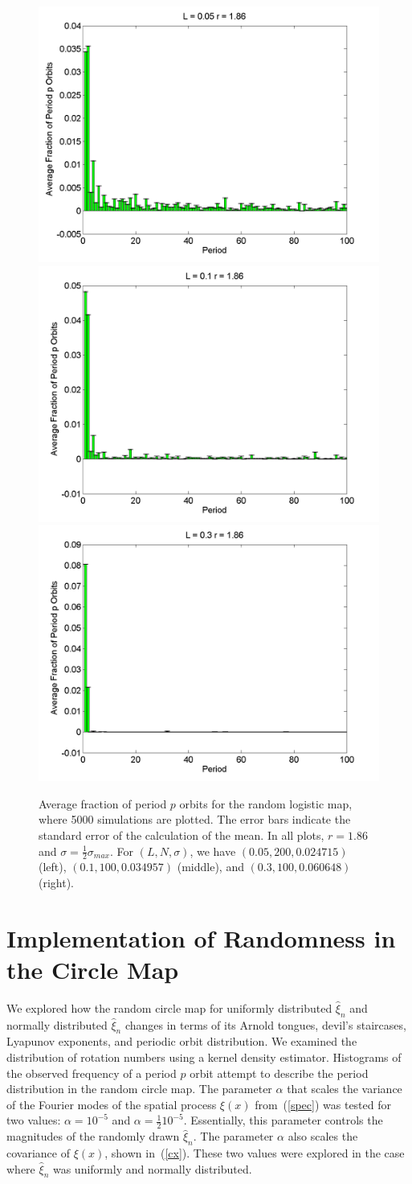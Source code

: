 \begin{figure}[H]\linespread{1}
\caption[Average fraction of period $p$ orbits for the random logistic
map, $\sigma=\frac{1}{2}\sigma_{max}$ and $r=1.86$]{Average fraction of period $p$ orbits for the random logistic
map, where 5000 simulations are plotted. The error bars indicate
the standard error of the calculation of the mean. In all plots,
$r=1.86$ and $\sigma=\frac{1}{2}\sigma_{max}$. For $(L,N,\sigma)$,
we have $(0.05, 200, 0.024715)$ (left), $(0.1, 100, 0.034957)$
(middle), and $(0.3, 100, 0.060648)$ (right).}\label{fig:rloghist2_hs}
	\begin{center}	\includegraphics[width=.33\textwidth]{figs/rlog_hist_hs_L_005_r_186_s_0024715_a_15267e-05_sims_5000.png}\hfill
\includegraphics[width=.33\textwidth]{figs/rlog_hist_hs_L_01_r_186_s_0034957_a_6105e-05_sims_5000.png}\hfill	
\includegraphics[width=.33\textwidth]{figs/rlog_hist_hs_L_03_r_186_s_0060648_a_000054762_sims_5000.png}
	\end{center}
\end{figure}

\section{Implementation of Randomness in the Circle Map}
We explored how the random circle map for uniformly distributed $\hat{\xi}_n$ and
normally distributed $\hat{\xi}_n$ changes in terms of its Arnold
tongues, devil's staircases, Lyapunov exponents, and periodic orbit distribution. We examined the
distribution of rotation numbers using a kernel density
estimator. Histograms of the observed frequency of a period $p$ orbit
attempt to describe the period distribution in the random circle
map. The parameter $\alpha$ that scales the variance of the Fourier
modes of the spatial process $\xi(x)$ from~(\ref{spec}) was tested for two values: $\alpha=10^{-5}$
and $\alpha = \frac{1}{2}10^{-5}$. Essentially, this parameter controls
the magnitudes of the randomly drawn $\hat{\xi}_n$. The parameter $\alpha$ also scales the
covariance of $\xi(x)$, shown in~(\ref{cx}). These two values were explored in
the case where $\hat{\xi}_n$ was uniformly and normally distributed.

